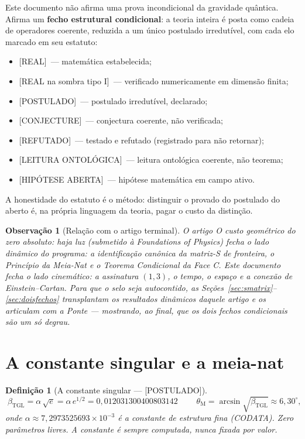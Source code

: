 \documentclass[11pt,a4paper]{article}
\newcommand{\REAL}{\textsf{[REAL]}}
\newcommand{\SOMBRA}{\textsf{[REAL na sombra tipo I]}}
\newcommand{\POST}{\textsf{[POSTULADO]}}
\newcommand{\CONJ}{\textsf{[CONJECTURE]}}
\newcommand{\REF}{\textsf{[REFUTADO]}}
\newcommand{\ONTO}{\textsf{[LEITURA ONTOLÓGICA]}}
\newcommand{\ABERTO}{\textsf{[HIPÓTESE ABERTA]}}
\newcommand{\bTGL}{\beta_{\mathrm{TGL}}}
\newcommand{\thM}{\theta_{\mathrm M}}
\newtheorem{definition}{Definição}
\newtheorem{remark}{Observação}
\begin{document}
Este documento não afirma uma prova incondicional da gravidade quântica.
Afirma um \textbf{fecho estrutural condicional}: a teoria inteira é posta
como cadeia de operadores coerente, reduzida a um único postulado
irredutível, com cada elo marcado em seu estatuto:
\begin{itemize}[noitemsep]
  \item \REAL\ --- matemática estabelecida;
  \item \SOMBRA\ --- verificado numericamente em dimensão finita;
  \item \POST\ --- postulado irredutível, declarado;
  \item \CONJ\ --- conjectura coerente, não verificada;
  \item \REF\ --- testado e refutado (registrado para não retornar);
  \item \ONTO\ --- leitura ontológica coerente, não teorema;
  \item \ABERTO\ --- hipótese matemática em campo ativo.
\end{itemize}
A honestidade do estatuto é o método: distinguir o provado do postulado do
aberto é, na própria linguagem da teoria, pagar o custo da distinção.

\begin{remark}[Relação com o artigo terminal]
O artigo \emph{O custo geométrico do zero absoluto: haja luz} (submetido à
\emph{Foundations of Physics}) fecha o lado \emph{dinâmico} do programa: a
identificação canônica da matriz-S de fronteira, o Princípio da Meia-Nat e o
Teorema Condicional da Face C. Este documento fecha o lado
\emph{cinemático}: a assinatura $(1,3)$, o tempo, o espaço e a conexão de
Einstein--Cartan. Para que o selo seja autocontido, as
Seções~\ref{sec:smatrix}--\ref{sec:doisfechos} transplantam os resultados
dinâmicos daquele artigo e os articulam com a Ponte --- mostrando, ao final,
que os dois fechos condicionais são um só degrau.
\end{remark}

\section{A constante singular e a meia-nat}
\begin{definition}[A constante singular --- \POST]\label{def:beta}
\begin{equation}
\boxed{\;\bTGL=\alpha\,\sqrt e=\alpha\,e^{1/2}=0{,}012031300400803142\;}
\qquad
\thM=\arcsin\sqrt{\bTGL}\approx 6{,}30^\circ,
\end{equation}
onde $\alpha\approx 7{,}2973525693\times10^{-3}$ é a constante de estrutura
fina (CODATA). Zero parâmetros livres. A constante é \emph{sempre} computada,
nunca fixada por valor.
\end{definition}
\end{document}
